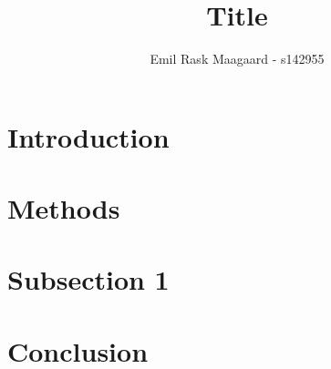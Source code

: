 \documentclass{dtu_report_columns}
\title{Title}
\author{Emil Rask Maagaard - s142955}
\begin{document}
\maketitle{}




\section*{Introduction}


\section*{Methods}


\section*{Subsection 1}


\section*{Conclusion}



% 
\end{document}
